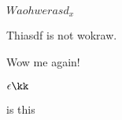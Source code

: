 \documentclass{omdoc}
\begin{document}
\begin{assertion}[id=hello, type=lemma]
  $ Waohwer asd_x $
\end{assertion}

\begin{axiom}[id=newAx]
 Thiasdf is not wokraw.
\end{axiom}

\begin{symboldec}[name=zero, title=Not working]
Wow me again!
\end{symboldec}

\begin{definition}[id=kk.def]
$ \epsilon \kk $
\end{definition}

\begin{definition}[id=test.one]
  is this
\end{definition}

\begin{definition}
\end{definition}
\end{document}

